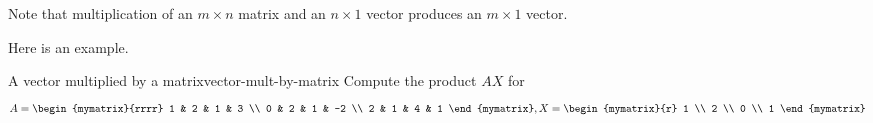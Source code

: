 Note that multiplication of an $m \times n$ matrix and an $n \times 1$ vector produces an $m \times 1$ vector.

Here is an example.

\begin{example}{A vector multiplied by a matrix}{vector-mult-by-matrix}
Compute the product $AX$ for 
\begin{equation*}
A = \begin{mymatrix}{rrrr}
1 & 2 & 1 & 3 \\
0 & 2 & 1 & -2 \\
2 & 1 & 4 & 1
\end{mymatrix}, X =  \begin{mymatrix}{r}
1 \\
2 \\
0 \\
1
\end{mymatrix} 
\end{equation*}
\end{example}

